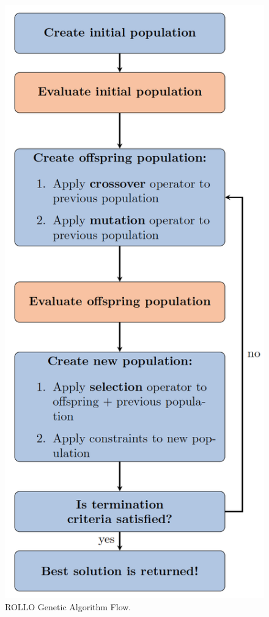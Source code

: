 \begin{frame}
\begin{columns}
\begin{column}{0.3\textwidth}
\begin{figure}
                \includegraphics[width=\linewidth]{figures/rollo-flow2.png} 
                \caption{ROLLO Genetic Algorithm Flow.}
            \end{figure}
        \end{column}
    \end{columns}


\end{frame}
